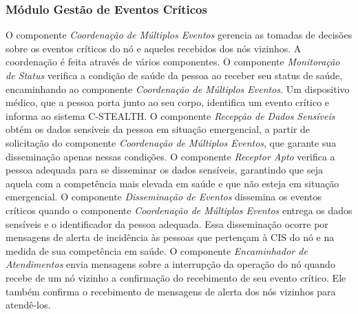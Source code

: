 \documentclass[12pt]{article}
\begin{document}
\vspace{-0.6cm}

\subsubsection{Módulo Gestão de Eventos Críticos}
\vspace{-0.2cm}
O componente \textit{Coordenação de Múltiplos Eventos} gerencia %
as tomadas de decisões sobre os eventos críticos do nó e aqueles recebidos dos nós vizinhos. A coordenação é feita através de vários componentes. O componente \textit{Monitoração de Status} verifica a condição de saúde da pessoa ao receber seu status de saúde, encaminhando ao componente \textit{Coordenação de Múltiplos Eventos}. Um dispositivo médico, que a pessoa porta junto ao seu corpo, %
identifica um evento crítico e informa ao sistema \mbox{C-STEALTH}. O componente \textit{Recepção de Dados Sensíveis} obtém os dados sensíveis da pessoa em situação emergencial, a partir de solicitação do componente \textit{Coordenação de Múltiplos Eventos}, que garante sua disseminação apenas nessas condições. O componente \textit{Receptor Apto} verifica a pessoa adequada para se disseminar os dados sensíveis, garantindo que seja aquela com a competência mais elevada em saúde e que não esteja em situação emergencial. O componente \textit{Disseminação de Eventos} dissemina os eventos críticos quando o componente \textit{Coordenação de Múltiplos Eventos} entrega os dados sensíveis e o identificador da pessoa adequada. Essa disseminação ocorre por mensagens de alerta de incidência às pessoas que pertençam à
CIS
do nó e na medida de sua competência em saúde. O componente \textit{Encaminhador de Atendimentos} envia mensagens sobre %
a interrupção da operação do nó quando recebe de um nó vizinho a confirmação do recebimento de seu evento crítico. Ele também confirma o recebimento de mensagens de alerta %
dos nós vizinhos para
atendê-los.
\end{document}
